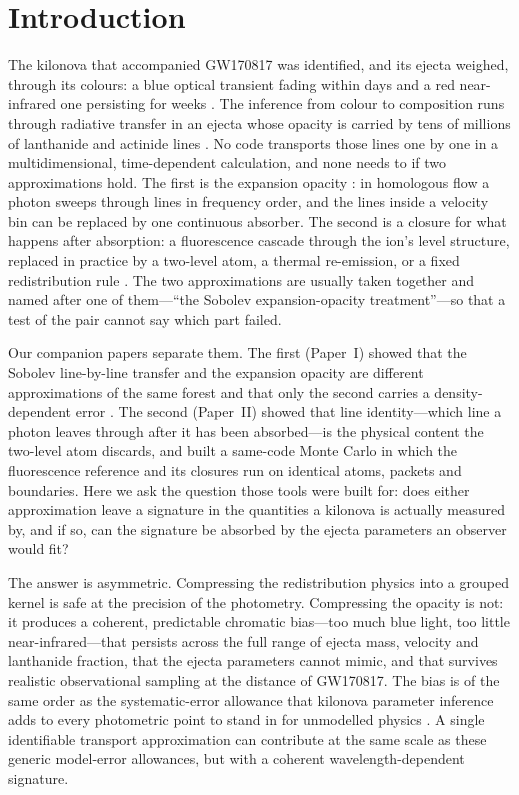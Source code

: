 \documentclass[11pt]{article}
\begin{document}
\section{Introduction}\label{sec:intro}

The kilonova that accompanied GW170817 was identified, and its ejecta weighed, through its colours: a blue optical transient fading within days and a red near-infrared one persisting for weeks \cite{gw170817,tanvir2017,chornock2017,kasen2017,metzger2020}. The inference from colour to composition runs through radiative transfer in an ejecta whose opacity is carried by tens of millions of lanthanide and actinide lines \cite{tanaka2020,kato2024,fontes2020,banerjee2022}. No code transports those lines one by one in a multidimensional, time-dependent calculation, and none needs to if two approximations hold. The first is the expansion opacity \cite{karp1977,eastman1993}: in homologous flow a photon sweeps through lines in frequency order, and the lines inside a velocity bin can be replaced by one continuous absorber. The second is a closure for what happens after absorption: a fluorescence cascade through the ion's level structure, replaced in practice by a two-level atom, a thermal re-emission, or a fixed redistribution rule \cite{lucy2002,lucy2003,sedona,tardis}. The two approximations are usually taken together and named after one of them---``the Sobolev expansion-opacity treatment''---so that a test of the pair cannot say which part failed.

Our companion papers separate them. The first (Paper~I) showed that the Sobolev line-by-line transfer and the expansion opacity are different approximations of the same forest and that only the second carries a density-dependent error \cite{sobolev1960,castor1970,jeffery1993}. The second (Paper~II) showed that line identity---which line a photon leaves through after it has been absorbed---is the physical content the two-level atom discards, and built a same-code Monte Carlo in which the fluorescence reference and its closures run on identical atoms, packets and boundaries. Here we ask the question those tools were built for: does either approximation leave a signature in the quantities a kilonova is actually measured by, and if so, can the signature be absorbed by the ejecta parameters an observer would fit?

The answer is asymmetric. Compressing the redistribution physics into a grouped kernel is safe at the precision of the photometry. Compressing the opacity is not: it produces a coherent, predictable chromatic bias---too much blue light, too little near-infrared---that persists across the full range of ejecta mass, velocity and lanthanide fraction, that the ejecta parameters cannot mimic, and that survives realistic observational sampling at the distance of GW170817. The bias is of the same order as the systematic-error allowance that kilonova parameter inference adds to every photometric point to stand in for unmodelled physics \cite{coughlin2018,pang2023,jhawar2025}. A single identifiable transport approximation can contribute at the same scale as these generic model-error allowances, but with a coherent wavelength-dependent signature.
\end{document}
